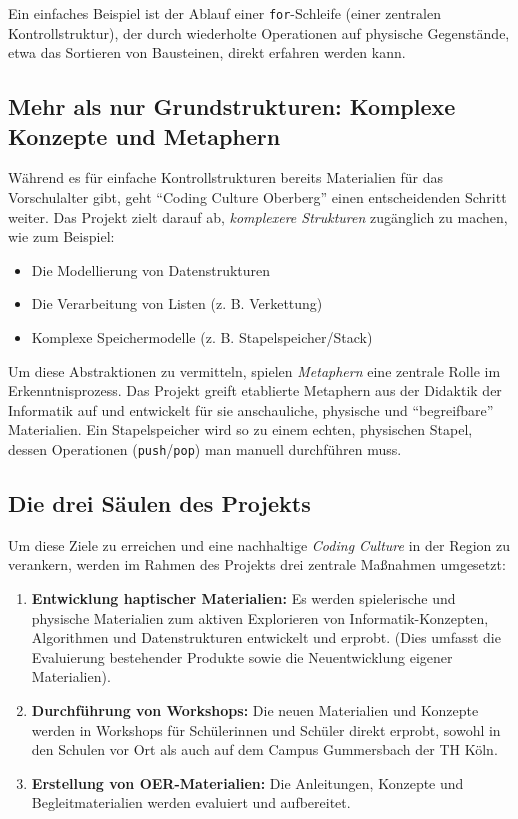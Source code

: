\documentclass[a5paper,pagesize,10pt,bibtotoc,pointlessnumbers,
normalheadings,DIV=9,twoside=false]{scrbook}
\begin{document}
Ein einfaches Beispiel ist der Ablauf einer \texttt{for}-Schleife (einer zentralen Kontrollstruktur), der durch wiederholte Operationen auf physische Gegenstände, etwa das Sortieren von Bausteinen, direkt erfahren werden kann.

\subsection*{Mehr als nur Grundstrukturen: Komplexe Konzepte und Metaphern}

Während es für einfache Kontrollstrukturen bereits Materialien für das Vorschulalter gibt, geht ``Coding Culture Oberberg'' einen entscheidenden Schritt weiter. Das Projekt zielt darauf ab, \textit{komplexere Strukturen} zugänglich zu machen, wie zum Beispiel:

\begin{itemize}
    \item Die Modellierung von Datenstrukturen
    \item Die Verarbeitung von Listen (z. B. Verkettung)
    \item Komplexe Speichermodelle (z. B. Stapelspeicher/Stack)
\end{itemize}

Um diese Abstraktionen zu vermitteln, spielen \textit{Metaphern} eine zentrale Rolle im Erkenntnisprozess. Das Projekt greift etablierte Metaphern aus der Didaktik der Informatik auf und entwickelt für sie anschauliche, physische und ``begreifbare'' Materialien. Ein Stapelspeicher wird so zu einem echten, physischen Stapel, dessen Operationen (\texttt{push}/\texttt{pop}) man manuell durchführen muss.

\subsection*{Die drei Säulen des Projekts}

Um diese Ziele zu erreichen und eine nachhaltige \textit{Coding Culture} in der Region zu verankern, werden im Rahmen des Projekts drei zentrale Maßnahmen umgesetzt:

\begin{enumerate}
    \item \textbf{Entwicklung haptischer Materialien:} Es werden spielerische und physische Materialien zum aktiven Explorieren von Informatik-Konzepten, Algorithmen und Datenstrukturen entwickelt und erprobt. (Dies umfasst die Evaluierung bestehender Produkte sowie die Neuentwicklung eigener Materialien).
    \item \textbf{Durchführung von Workshops:} Die neuen Materialien und Konzepte werden in Workshops für Schülerinnen und Schüler direkt erprobt, sowohl in den Schulen vor Ort als auch auf dem Campus Gummersbach der TH Köln.
    \item \textbf{Erstellung von OER-Materialien:} Die Anleitungen, Konzepte und Begleitmaterialien werden evaluiert und aufbereitet.
\end{enumerate}
\end{document}
